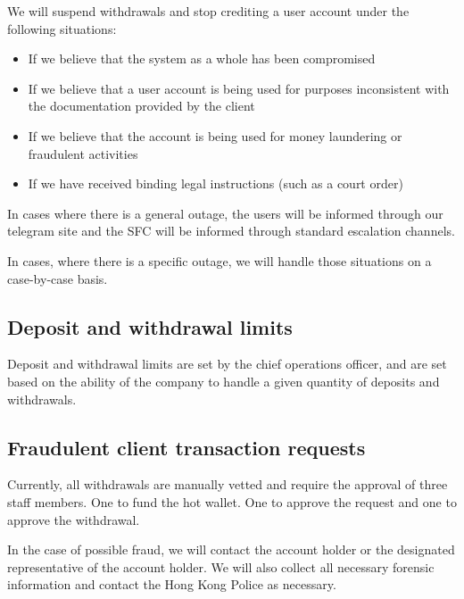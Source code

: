 We will suspend withdrawals and stop crediting a user account under
the following situations:
\begin{itemize}
\item If we believe that the system as a whole has been compromised
\item If we believe that a user account is being used for purposes
  inconsistent with the documentation provided by the client
\item If we believe that the account is being used for money
  laundering or fraudulent activities
\item If we have received binding legal instructions (such as a court order)
\end{itemize}

In cases where there is a general outage, the users will be informed
through our telegram site and the SFC will be informed through
standard escalation channels.

In cases, where there is a specific outage, we will handle those
situations on a case-by-case basis.

\subsection{Deposit and withdrawal limits}
Deposit and withdrawal limits are set by the chief operations officer,
and are set based on the ability of the company to handle a given
quantity of deposits and withdrawals.

\subsection{Fraudulent client transaction requests}
Currently, all withdrawals are manually vetted and require the approval
of three staff members.  One to fund the hot wallet.  One to approve
the request and one to approve the withdrawal.

In the case of possible fraud, we will contact the account holder or the
designated representative of the account holder.  We will also collect
all necessary forensic information and contact the Hong Kong Police as
necessary.



